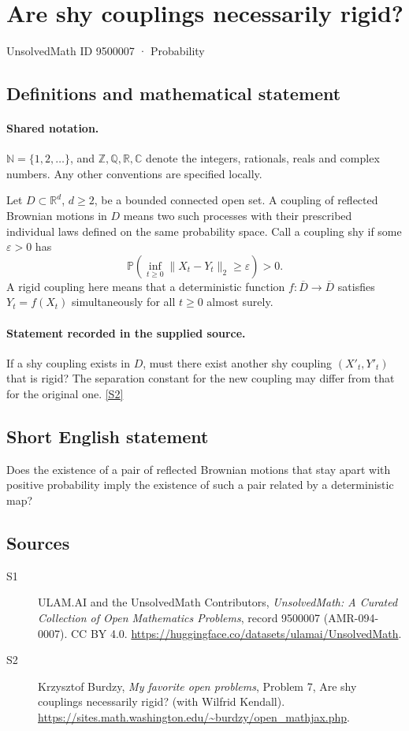 \documentclass[11pt]{article}
\newcommand{\sref}[2]{\hyperlink{source:#1:#2}{[S#2]}}
\begin{document}
\setcounter{section}{9500006}
\section{Are shy couplings necessarily rigid?}\label{9500007}
{\small\sffamily UnsolvedMath ID 9500007 · Probability}
\subsection{Definitions and mathematical statement}

\paragraph{Shared notation.}$\mathbb N=\{1,2,\ldots\}$, and $\mathbb Z,\mathbb Q,\mathbb R,\mathbb C$ denote the integers, rationals, reals and complex numbers. Any other conventions are specified locally.


Let $D\subset\mathbb R^d$, $d\ge2$, be a bounded connected open set. A coupling of reflected Brownian motions in $D$ means two such processes with their prescribed individual laws defined on the same probability space. Call a coupling shy if some $\varepsilon>0$ has
\[\mathbb P\left(\inf_{t\ge0}\|X_t-Y_t\|_2\ge\varepsilon\right)>0.\]
A rigid coupling here means that a deterministic function $f:\overline D\to\overline D$ satisfies $Y_t=f(X_t)$ simultaneously for all $t\ge0$ almost surely.
\paragraph{Statement recorded in the supplied source.}
If a shy coupling exists in $D$, must there exist another shy coupling $(X'_t,Y'_t)$ that is rigid? The separation constant for the new coupling may differ from that for the original one. \sref{9500007}{2}
\subsection{Short English statement}
Does the existence of a pair of reflected Brownian motions that stay apart with positive probability imply the existence of such a pair related by a deterministic map?
\subsection{Sources}
\begin{description}
\item[\hypertarget{source:9500007:1}{S1}] ULAM.AI and the UnsolvedMath Contributors, \emph{UnsolvedMath: A Curated Collection of Open Mathematics Problems}, record 9500007 (AMR-094-0007). CC BY 4.0. \url{https://huggingface.co/datasets/ulamai/UnsolvedMath}.
\item[\hypertarget{source:9500007:2}{S2}] Krzysztof Burdzy, \emph{My favorite open problems}, Problem 7, Are shy couplings necessarily rigid? (with Wilfrid Kendall). \url{https://sites.math.washington.edu/~burdzy/open_mathjax.php}.
\end{description}
\label{end:9500007}
\end{document}
